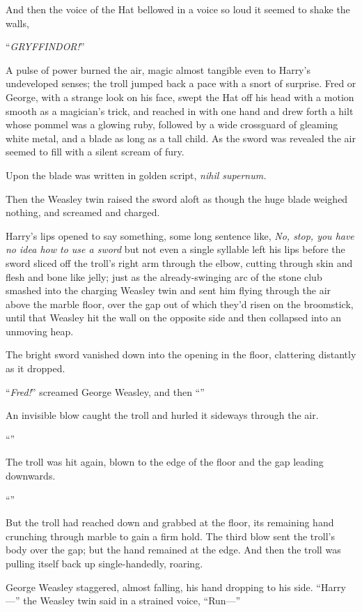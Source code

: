 And then the voice of the Hat bellowed in a voice so loud it seemed to shake the walls,

“\emph{GRYFFINDOR!}”

A pulse of power burned the air, magic almost tangible even to Harry’s undeveloped senses; the troll jumped back a pace with a snort of surprise. Fred or George, with a strange look on his face, swept the Hat off his head with a motion smooth as a magician’s trick, and reached in with one hand and drew forth a hilt whose pommel was a glowing ruby, followed by a wide crossguard of gleaming white metal, and a blade as long as a tall child. As the sword was revealed the air seemed to fill with a silent scream of fury.

Upon the blade was written in golden script, \emph{nihil supernum.}

Then the Weasley twin raised the sword aloft as though the huge blade weighed nothing, and screamed and charged.

Harry’s lips opened to say something, some long sentence like, \emph{No, stop, you have no idea how to use a sword} but not even a single syllable left his lips before the sword sliced off the troll’s right arm through the elbow, cutting through skin and flesh and bone like jelly; just as the already-swinging arc of the stone club smashed into the charging Weasley twin and sent him flying through the air above the marble floor, over the gap out of which they’d risen on the broomstick, until that Weasley hit the wall on the opposite side and then collapsed into an unmoving heap.

The bright sword vanished down into the opening in the floor, clattering distantly as it dropped.

“\emph{Fred!}” screamed George Weasley, and then “”

An invisible blow caught the troll and hurled it sideways through the air.

“”

The troll was hit again, blown to the edge of the floor and the gap leading downwards.

“”

But the troll had reached down and grabbed at the floor, its remaining hand crunching through marble to gain a firm hold. The third blow sent the troll’s body over the gap; but the hand remained at the edge. And then the troll was pulling itself back up single-handedly, roaring.

George Weasley staggered, almost falling, his hand dropping to his side. “Harry—” the Weasley twin said in a strained voice, “Run—”

